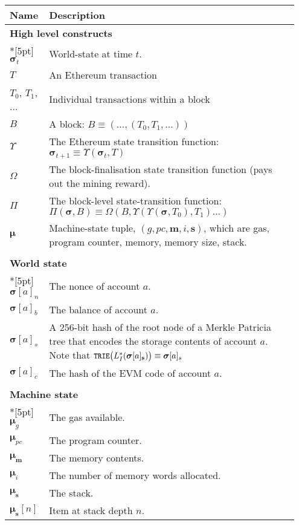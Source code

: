 \documentclass[9pt,oneside]{amsart}
\begin{document}
\pagecolor{lightyellow}

\begin{longtable}{p{0.10\linewidth}p{0.85\linewidth}}
\toprule
Name & Description \\
\midrule
\endhead
\multicolumn{2}{l}{\textbf{High level constructs}} \\*[5pt]
$\boldsymbol{\sigma}_t$ & World-state at time $t$. \\
$T$ & An Ethereum transaction \\
$T_0$, $T_1$, ... & Individual transactions within a block \\
$B$ & A block: $B \equiv (..., (T_0, T_1, ...) )$ \\
$\Upsilon$ & The Ethereum state transition function: $\boldsymbol{\sigma}_{t+1} \equiv \Upsilon(\boldsymbol{\sigma}_t, T)$ \\
$\Omega$ & The block-finalisation state transition function (pays out the
mining reward). \\
$\Pi$ & The block-level state-transition function: $\Pi(\boldsymbol{\sigma}, B) \equiv \Omega(B, \Upsilon(\Upsilon(\boldsymbol{\sigma}, T_0), T_1) ...)$ \\
$\boldsymbol{\mu}$ & Machine-state tuple, $(g, pc, \mathbf{m}, i, \mathbf{s})$,
which are gas, program counter, memory, memory size, stack. \\

\vspace{5pt} \\
\midrule
\multicolumn{2}{l}{\textbf{World state}} \\*[5pt]
$\boldsymbol{\sigma}[a]_n$ & The nonce of account $a$. \\
$\boldsymbol{\sigma}[a]_b$ & The balance of account $a$. \\
$\boldsymbol{\sigma}[a]_s$ & A 256-bit hash of the root node of a
Merkle Patricia tree that encodes the storage contents of account $a$. Note
that $\texttt{\small TRIE}\big(L_I^*(\boldsymbol{\sigma}[a]_\mathbf{s})\big)
\equiv \boldsymbol{\sigma}[a]_s$ \\
$\boldsymbol{\sigma}[a]_c$ & The hash of the EVM code of account $a$. \\

\vspace{5pt} \\
\midrule
\multicolumn{2}{l}{\textbf{Machine state}} \\*[5pt]
$\boldsymbol{\mu}_g$ & The gas available. \\
$\boldsymbol{\mu}_{pc}$ & The program counter. \\
$\boldsymbol{\mu}_\mathbf{m}$ & The memory contents. \\
$\boldsymbol{\mu}_i$ & The number of memory words allocated. \\
$\boldsymbol{\mu}_\mathbf{s}$ & The stack. \\
$\boldsymbol{\mu}_\mathbf{s}[n]$ & Item at stack depth $n$. \\


\end{longtable}
\end{document}
